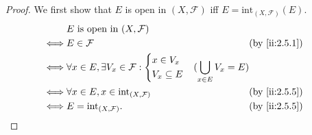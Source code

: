 \begin{proof}
  We first show that \(E\) is open in \((X, \mathcal{F})\) iff \(E = \text{int}_{(X, \mathcal{F})}(E)\).
  \begin{align*}
         & E \text{ is open in } (X, \mathcal{F})                                                                   \\
    \iff & E \in \mathcal{F}                                             &                             & \by{ii:2.5.1} \\
    \iff & \forall x \in E, \exists V_x \in \mathcal{F} : \begin{dcases}
                                                            x \in V_x \\
                                                            V_x \subseteq E
                                                          \end{dcases} & (\bigcup_{x \in E} V_x = E)                \\
    \iff & \forall x \in E, x \in \text{int}_{(X, \mathcal{F})}          &                             & \by{ii:2.5.5} \\
    \iff & E = \text{int}_{(X, \mathcal{F})}.                            &                             & \by{ii:2.5.5}
  \end{align*}


\end{proof}
